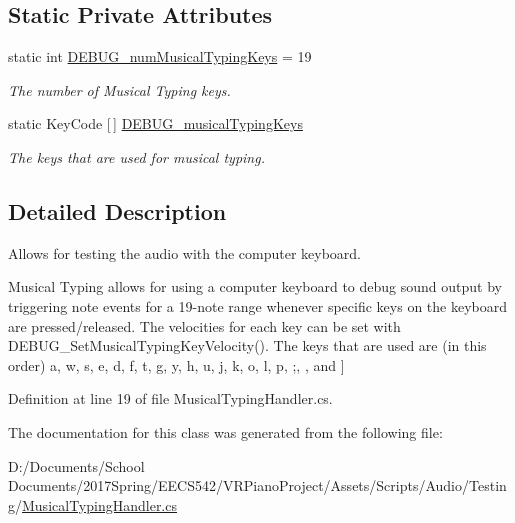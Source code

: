 \subsection*{Static Private Attributes}
\begin{DoxyCompactItemize}
\item 
static int \hyperlink{group___mus_typ_const_ga1a5182f5dda1cd3a5b400911a3f4cb69}{D\+E\+B\+U\+G\+\_\+num\+Musical\+Typing\+Keys} = 19
\begin{DoxyCompactList}\small\item\em The number of Musical Typing keys. \end{DoxyCompactList}\item 
static Key\+Code \mbox{[}$\,$\mbox{]} \hyperlink{group___mus_typ_const_gad8b9000a0b6c93d23310f54d07dd0b90}{D\+E\+B\+U\+G\+\_\+musical\+Typing\+Keys}
\begin{DoxyCompactList}\small\item\em The keys that are used for musical typing. \end{DoxyCompactList}\end{DoxyCompactItemize}


\subsection{Detailed Description}
Allows for testing the audio with the computer keyboard. 

Musical Typing allows for using a computer keyboard to debug sound output by triggering note events for a 19-\/note range whenever specific keys on the keyboard are pressed/released. The velocities for each key can be set with D\+E\+B\+U\+G\+\_\+\+Set\+Musical\+Typing\+Key\+Velocity(). The keys that are used are (in this order) a, w, s, e, d, f, t, g, y, h, u, j, k, o, l, p, ;, \textquotesingle{}, and \mbox{]} 

Definition at line 19 of file Musical\+Typing\+Handler.\+cs.



The documentation for this class was generated from the following file\+:\begin{DoxyCompactItemize}
\item 
D\+:/\+Documents/\+School Documents/2017\+Spring/\+E\+E\+C\+S542/\+V\+R\+Piano\+Project/\+Assets/\+Scripts/\+Audio/\+Testing/\hyperlink{_musical_typing_handler_8cs}{Musical\+Typing\+Handler.\+cs}\end{DoxyCompactItemize}
